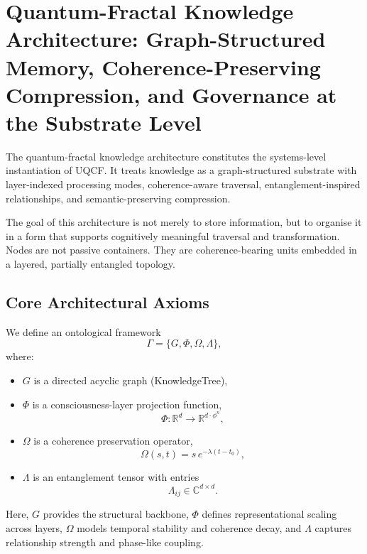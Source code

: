 \documentclass[12pt]{article}
\begin{document}
\section{Quantum-Fractal Knowledge Architecture: Graph-Structured Memory, Coherence-Preserving Compression, and Governance at the Substrate Level}\label{sec:integration}
The quantum-fractal knowledge architecture constitutes the systems-level instantiation of UQCF. It treats knowledge as a graph-structured substrate with layer-indexed processing modes, coherence-aware traversal, entanglement-inspired relationships, and semantic-preserving compression.

The goal of this architecture is not merely to store information, but to organise it in a form that supports cognitively meaningful traversal and transformation. Nodes are not passive containers. They are coherence-bearing units embedded in a layered, partially entangled topology.

\subsection{Core Architectural Axioms}
We define an ontological framework
\begin{equation}
\Gamma = \{G, \Phi, \Omega, \Lambda\},
\end{equation}
where:
\begin{itemize}[leftmargin=2em]
    \item $G$ is a directed acyclic graph (KnowledgeTree),
    \item $\Phi$ is a consciousness-layer projection function,
    \begin{equation}
    \Phi: \mathbb{R}^d \to \mathbb{R}^{d\cdot \phi^n},
    \end{equation}
    \item $\Omega$ is a coherence preservation operator,
    \begin{equation}
    \Omega(s,t) = s\,e^{-\lambda (t-t_0)},
    \end{equation}
    \item $\Lambda$ is an entanglement tensor with entries
    \begin{equation}
    \Lambda_{ij} \in \mathbb{C}^{d\times d}.
    \end{equation}
\end{itemize}
Here, $G$ provides the structural backbone, $\Phi$ defines representational scaling across layers, $\Omega$ models temporal stability and coherence decay, and $\Lambda$ captures relationship strength and phase-like coupling.
\end{document}
